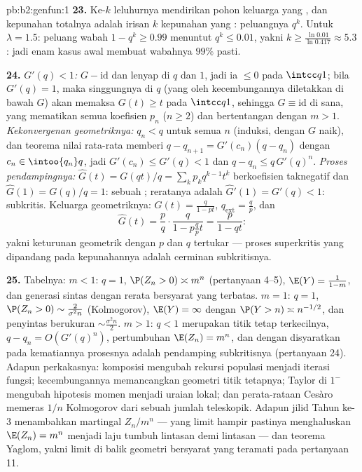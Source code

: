 \begin{solution}{pb:b2:genfun:1}
\textbf{23.} Ke-$k$ leluhurnya mendirikan pohon keluarga
yang , dan kepunahan totalnya adalah irisan $k$
 kepunahan yang : peluangnya $q^k$. Untuk
$\lambda = 1.5$: peluang wabah $1 - q^k \geq 0.99$
menuntut $q^k \leq 0.01$, yakni $k \geq
\frac{\ln 0.01}{\ln 0.417} \approx 5.3$: jadi enam kasus awal
membuat wabahnya $99\%$ pasti.

\textbf{24.} \emph{$G'(q) < 1$:} $G - \mathrm{id}$ 
dan lenyap di $q$ dan $1$, jadi ia $\leq 0$ pada $\intcc
q1$; bila $G'(q) = 1$, maka singgungnya di $q$ (yang oleh kecembungannya
diletakkan di bawah $G$) akan memaksa $G(t) \geq t$ pada $\intcc q1$,
sehingga $G \equiv \mathrm{id}$ di sana, yang mematikan semua koefisien
$p_n$ ($n \geq 2$) dan bertentangan dengan $m > 1$. \emph{Kekonvergenan
geometriknya:} $q_n < q$ untuk semua $n$ (induksi, dengan $G$
naik), dan teorema nilai rata-rata memberi $q - q_{n+1} =
G'(c_n)(q - q_n)$ dengan $c_n \in \intoo{q_n}q$, jadi $G'(c_n)
\leq G'(q) < 1$ dan $q - q_n \leq q\,G'(q)^n$. \emph{Proses
pendampingnya:} $\widehat G(t) = G(qt)/q =
\sum_kp_kq^{k-1}t^k$ berkoefisien taknegatif dan
$\widehat G(1) = G(q)/q = 1$: sebuah ; reratanya adalah $\widehat
G'(1) = G'(q) < 1$: subkritis. Keluarga geometriknya: $G(t) =
\frac{q}{1-pt}$, $q_{\mathrm{ext}} = \frac qp$, dan
\[
\widehat G(t) = \frac pq\cdot\frac{q}{1 - p\frac qp t}
= \frac{p}{1 - qt} :
\]
yakni  keturunan geometrik dengan $p$ dan $q$ tertukar ---
proses superkritis yang dipandang pada  kepunahannya adalah
cerminan subkritisnya.

\textbf{25.} Tabelnya: $m < 1$: $q = 1$, $\P(Z_n > 0)
\asymp m^n$ (pertanyaan 4--5), $\E(Y) = \frac1{1-m}$, dan
generasi sintas dengan rerata bersyarat yang terbatas. $m = 1$:
$q = 1$, $\P(Z_n > 0) \sim \frac2{\sigma^2n}$ (Kolmogorov),
$\E(Y) = \infty$ dengan $\P(Y > n) \asymp n^{-1/2}$, dan penyintas
berukuran $\sim \frac{\sigma^2n}2$. $m > 1$: $q < 1$ merupakan
titik tetap terkecilnya, $q - q_n = O(G'(q)^n)$, pertumbuhan $\E(Z_n) = m^n$,
dan dengan disyaratkan pada kematiannya prosesnya adalah
pendamping subkritisnya (pertanyaan 24). Adapun perkakasnya: komposisi
 mengubah rekursi populasi menjadi iterasi fungsi;
kecembungannya memancangkan geometri titik tetapnya; Taylor di
$1^-$ mengubah hipotesis momen menjadi uraian lokal; dan
perata-rataan Cesàro memeras $1/n$ Kolmogorov dari sebuah
jumlah teleskopik. Adapun jilid Tahun ke-3 menambahkan martingal $Z_n/
m^n$ --- yang limit hampir pastinya menghaluskan $\E(Z_n) = m^n$ menjadi
laju tumbuh lintasan demi lintasan --- dan teorema
Yaglom, yakni  limit di balik geometri bersyarat yang
teramati pada pertanyaan 11.

\end{solution}
